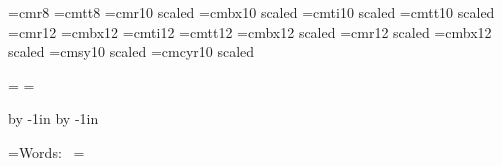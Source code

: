 








\font\small=cmr8
\font\smalltt=cmtt8
\font\medium=cmr10 scaled \magstephalf
\font\mediumbx=cmbx10 scaled \magstephalf
\font\mediumit=cmti10 scaled \magstephalf
\font\mediumtt=cmtt10 scaled \magstephalf
\font\large=cmr12
\font\largebx=cmbx12
\font\largeit=cmti12
\font\largett=cmtt12
\font\Largebx=cmbx12 scaled \magstephalf
\font\huge=cmr12 scaled 
\font\hugebx=cmbx12 scaled 
\font\mediumsy=cmsy10 scaled \magstephalf
\font\mediumcy=cmcyr10 scaled \magstephalf

\headline={}
\footline={}

\hsize=210mm
\vsize=297mm

\advance\voffset by -1in
\advance\hoffset by -1in

\newskip\titleskip
\titleskip=8pt

\newskip\copyrightskip
\copyrightskip=6pt

\newskip\composerskip
\composerskip=4pt

\newdimen\wmdimen
{}=\hbox{{\large Words:  }}
\wmdimen=



\def\A{%
\vtop to 0pt{\vbox to \vsize{\hbox to 0pt{\hskip\dimen0
\vbox to 0pt{\hrule width 1.5pt height .5\vsize depth .5\vsize\vss}\hss
}\hbox to 0pt{\vbox to 0pt{\vskip.5\vsize\hrule width \hsize height .75pt depth .75pt\vss}\hss
}\hbox to 0pt{\vbox to 0pt{\vskip.25\vsize\hrule width \hsize height .75pt depth .75pt\vss}\hss
}\hbox to 0pt{\vbox to 0pt{\vskip.75\vsize\hrule width \hsize height .75pt depth .75pt\vss}\hss
}\vss
}\vss}\vskip-\vsize\vskip.25cm}

